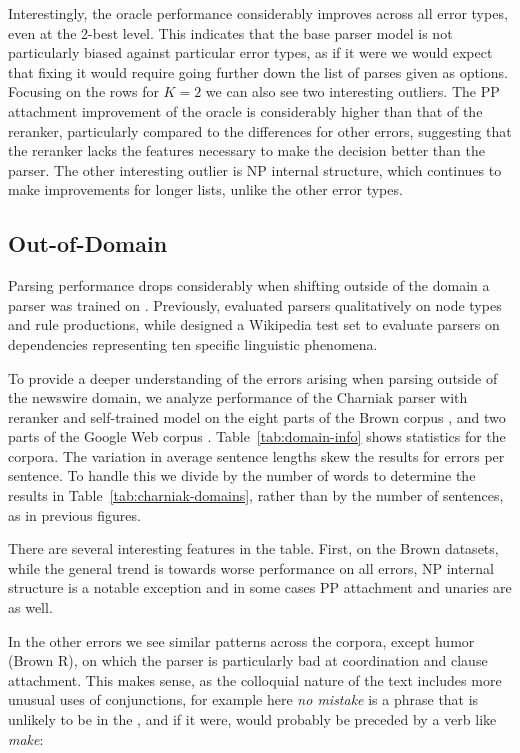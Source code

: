 Interestingly, the oracle performance considerably improves across all error types, even at the 2-best level.
This indicates that the base parser model is not particularly biased against particular error types, as if it were we would expect that fixing it would require going further down the list of parses given as options.
Focusing on the rows for $K=2$ we
can also see two interesting outliers.  The PP attachment improvement of the
oracle is considerably higher than that of the reranker, particularly compared
to the differences for other errors, suggesting that the reranker lacks the
features necessary to make the decision better than the parser.  The other
interesting outlier is NP internal structure, which continues to make
improvements for longer lists, unlike the other error types.

\subsection{Out-of-Domain}

Parsing performance drops considerably when shifting outside of the domain a
parser was trained on \parencite{Gildea:2001}.
Previously, \textcite{Clegg:2005:EIT:1626315.1626317} evaluated parsers qualitatively on
node types and rule productions, while  \textcite{Bender:2011:PEO:2145432.2145479}
designed a Wikipedia test set to evaluate parsers on dependencies representing
ten specific linguistic phenomena.

To provide a deeper understanding of the errors arising when parsing outside of
the newswire domain, we analyze performance of the Charniak parser with
reranker and self-trained model on the eight parts of the Brown corpus
\parencite{ptb}, and two parts of the Google Web
corpus \parencite{Petrov:2012}.  Table~\ref{tab:domain-info} shows statistics for
the corpora.  The variation in average sentence lengths skew the results for
errors per sentence.  To handle this we divide by the number of words to
determine the results in Table~\ref{tab:charniak-domains}, rather than by the
number of sentences, as in previous figures.

There are several interesting features in the table.  First, on the Brown
datasets, while the general trend is towards worse performance on all errors,
NP internal structure is a notable exception and in some cases PP attachment
and unaries are as well.

In the other errors we see similar patterns across the corpora, except humor
(Brown R), on which the parser is particularly bad at coordination and clause
attachment.  This makes sense, as the colloquial nature of the text includes
more unusual uses of conjunctions, for example here \emph{no mistake} is a phrase that is unlikely to be in the \wsj, and if it were, would probably be preceded by a verb like \emph{make}:

